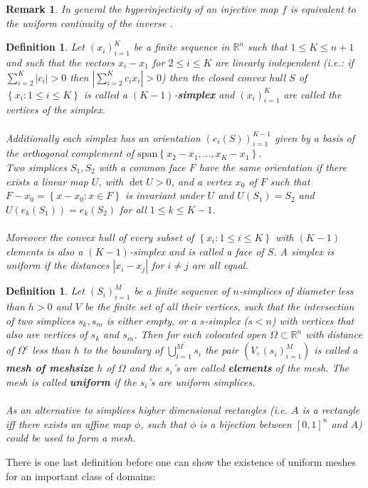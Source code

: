 \documentclass[11pt,a4paper,leqno]{report}
\newtheorem{definition}[theorem]{Definition}
\newtheorem{remark}[theorem]{Remark}
\numberwithin{equation}{chapter}
\begin{document}
\begin{remark}In general the hyperinjectivity of an injective map $f$ is equivalent to the uniform continuity of the inverse \cite[p. 126]{CANA} .\end{remark}
\begin{definition} Let $(x_i)_{i=1}^K$ be a finite sequence in $\mathbb{R}^n$ such that $1\leq K\leq n+1$ and such that the vectors $x_i-x_1$ for $2\leq i\leq K$ are linearly independent (i.e.: if $\sum_{i=2}^K |c_i|>0$ then $|\sum_{i=2}^K c_i x_i|>0$) then the closed convex hull $S$ of $\left\{x_i:1\leq i\leq K\right\}$ is called a $(K-1)$-\textbf{simplex} and $(x_i)_{i=1}^K$ are called the vertices of the simplex.\\
\\
Additionally each simplex has an orientation $(e_i(S))_{i=1}^{K-1}$ given by a basis of the orthogonal complement of $\text{span}\left\{x_2-x_1,...,x_{K}-x_1\right\}$. 
\\Two simplices $S_1,S_2$ with a common face $F$ have the same orientation if there exists a linear map $U$, with $\det U>0$, and a vertex $x_0$ of $F$  such that $F-x_0=\left\{x-x_0:x\in F\right\}$ is invariant under $U$ and $U(S_1)=S_2$ and $U(e_k(S_1))=e_k(S_2)$ for all $1\leq k\leq K-1$.\\
\\
Moreover the convex hull of every subset of $\left\{x_i:1\leq i\leq K\right\}$ with $(K-1)$ elements is also a $(K-1)$-simplex and is called a face of $S$. A simplex is uniform if the distances $|x_i-x_j|$ for $i\neq j$ are all equal.\\
\end{definition}

\begin{definition}Let $(S_i)_{i=1}^M$ be a finite sequence of $n$-simplices of diameter less than $h>0$ and $V$ be the finite set of all their vertices, such that the intersection of two simplices $s_k,s_m$ is either empty, or a $s$-simplex ($s<n$) with vertices that also are vertices of $s_k$ and $s_m$.  Then for each colocated open $\Omega\subset\mathbb{R}^n$ with distance of $\Omega^c$ less than $h$ to the boundary of $\overline{\bigcup_{i=1}^M s_i}$ the pair $(V,(s_i)_{i=1}^M)$ is called a \textbf{mesh of meshsize }$h$ of $\Omega$ and the $s_i$'s are called \textbf{elements} of the mesh. The mesh is called \textbf{uniform} if the $s_i$'s are uniform simplices.
\\
\\
As an alternative to simplices higher dimensional rectangles (i.e. $A$ is a rectangle iff there exists an affine map $\phi$, such that $\phi$ is a bijection between $[0,1]^n$ and $A$) could be used to form a mesh. \\
\end{definition}
There is one last definition before one can show the existence of uniform meshes for an important class of domains:
\end{document}
